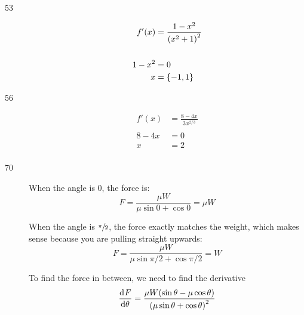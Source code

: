 \documentclass[letterpaper, landscape]{exam}
\begin{document}
\begin{description}
    \item[53] 
      \begin{align*}
        f'(x)   & = \frac{1 - x^2}{\del{ x^2 + 1 }^2} \\
        \\
        1 - x^2 & = 0 \\
        x       & = \{ -1, 1 \} \\
      \end{align*}


    \item[56] 
      \begin{align*}
        f'(x)  & = \frac{8 - 4x}{3 x^{2/3}} \\
        \\
        8 - 4x & = 0 \\
        x      & = 2 \\
      \end{align*}


    \item[70]
      When the angle is $0$, the force is:
      \[
        F = \frac{\mu W}{\mu \sin 0 + \cos 0} = \mu W 
        \]

      When the angle is $\sfrac{\pi}{2}$, the force exactly matches the weight, which makes sense
      because you are pulling straight upwards:
      \[
        F = \frac{\mu W}{\mu \sin \pi/2 + \cos \pi/2} = W 
      \]

      To find the force in between, we need to find the derivative
      \[
        \dod{F}{\theta} = \frac{\mu  W (\sin \theta - \mu \cos \theta)}
                               {\del{ \mu \sin \theta + \cos \theta }^2} \\
      \]


\end{description}
\end{document}
